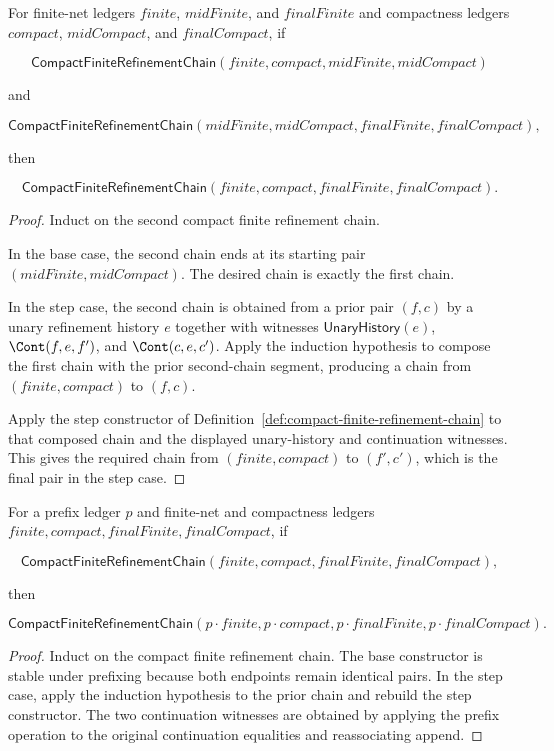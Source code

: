 \begin{theorem}
\label{thm:compact-finite-refinement-chain-transitivity}
For finite-net ledgers $finite$, $midFinite$, and $finalFinite$ and compactness
ledgers $compact$, $midCompact$, and $finalCompact$, if

$$
\mathsf{CompactFiniteRefinementChain}(finite,compact,midFinite,midCompact)
$$

and

$$
\mathsf{CompactFiniteRefinementChain}(midFinite,midCompact,finalFinite,finalCompact),
$$

then

$$
\mathsf{CompactFiniteRefinementChain}(finite,compact,finalFinite,finalCompact).
$$
\end{theorem}
\begin{proof}
Induct on the second compact finite refinement chain.

In the base case, the second chain ends at its starting pair
$(midFinite,midCompact)$. The desired chain is exactly the first chain.

In the step case, the second chain is obtained from a prior pair $(f,c)$ by a
unary refinement history $e$ together with witnesses $\mathsf{UnaryHistory}(e)$,
$\Cont(f,e,f')$, and $\Cont(c,e,c')$. Apply the induction hypothesis to compose
the first chain with the prior second-chain segment, producing a chain from
$(finite,compact)$ to $(f,c)$.

Apply the step constructor of
Definition~\ref{def:compact-finite-refinement-chain} to that composed chain and
the displayed unary-history and continuation witnesses. This gives the required
chain from $(finite,compact)$ to $(f',c')$, which is the final pair in the step
case.
\end{proof}

\begin{theorem}
\label{thm:compact-finite-refinement-chain-prefix-closed}
For a prefix ledger $p$ and finite-net and compactness ledgers
$finite,compact,finalFinite,finalCompact$, if

$$
\mathsf{CompactFiniteRefinementChain}(finite,compact,finalFinite,finalCompact),
$$

then

$$
\mathsf{CompactFiniteRefinementChain}(p\cdot finite,p\cdot compact,
p\cdot finalFinite,p\cdot finalCompact).
$$
\end{theorem}
\begin{proof}
Induct on the compact finite refinement chain. The base constructor is stable
under prefixing because both endpoints remain identical pairs. In the step
case, apply the induction hypothesis to the prior chain and rebuild the step
constructor. The two continuation witnesses are obtained by applying the prefix
operation to the original continuation equalities and reassociating append.
\end{proof}

